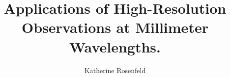 \title{Applications of High-Resolution Observations at Millimeter Wavelengths.}
\author{Katherine Rosenfeld}


